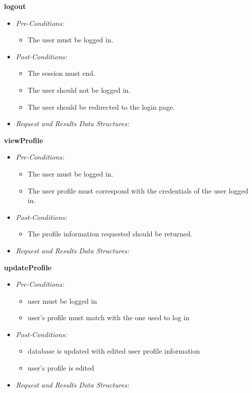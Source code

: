 \documentclass[a4paper,12pt]{article}
\begin{document}
\textbf{{logout}}
	\begin{itemize}
		\item \textit{Pre-Conditions:}
			\begin{itemize}
				\item The user must be logged in.
			\end{itemize}
		\item \textit{Post-Conditions:}
			\begin{itemize}
				\item The session must end.
				\item The user should not be logged in.
				\item The user should be redirected to the login page.
			\end{itemize}
		\item \textit{Request and Results Data Structures:}
	\end{itemize}
\textbf{{viewProfile}}
	\begin{itemize}
		\item \textit{Pre-Conditions:}
			\begin{itemize}
				\item The user must be logged in.
				\item The user profile must correspond with the credentials of the user logged in.
			\end{itemize}
		\item \textit{Post-Conditions:}
			\begin{itemize}
				\item The profile information requested should be returned.
			\end{itemize}
		\item \textit{Request and Results Data Structures:}
	\end{itemize}
\textbf{{updateProfile}}
	\begin{itemize}
		\item \textit{Pre-Conditions:}
		\begin{itemize}
			\item user must be logged in
			\item user's profile must match with the one used to log in
		\end{itemize}
		\item \textit{Post-Conditions:}
		\begin{itemize}
			\item database is updated with edited user profile information
			\item user's profile is edited
		\end{itemize}
		\item \textit{Request and Results Data Structures:}
	\end{itemize}
\end{document}

